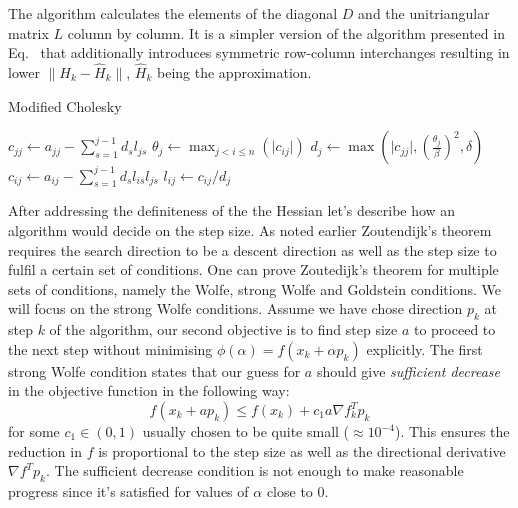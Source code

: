 \documentclass[11pt]{report}
\begin{document}
    The algorithm calculates the elements of the diagonal $D$ and the unitriangular matrix $L$ column by column.
    It is a simpler version of the algorithm presented in Eq.~\cite{gill2019practical} that additionally introduces symmetric row-column interchanges resulting in lower $ \lVert H_k - \hat{H}_k \rVert$, $\hat{H}_k$ being the approximation.
    \begin{algorithm}
        \label{alg:mod_chol}
        \caption{Modified Cholesky}
        \begin{algorithmic}
                \State $c_{jj} \gets a_{jj} - \sum_{s=1}^{j-1} d_s l_{js}$
                \State $\theta_j \gets \max_{j<i\leq n}(\lvert c_{ij} \rvert)$
                \State $d_j \gets  \max
                \left(
                \lvert c_{jj} \rvert,
                \left( \frac{\theta_j}{\beta} \right)^2,
                \delta \right)$
                    \State $c_{ij} \gets a_{ij} - \sum_{s=1}^{j-1} d_s l_{is} l_{js}$
                    \State $l_{ij} \gets c_{ij} / d_j$
                \EndFor
            \EndFor
        \end{algorithmic}
    \end{algorithm}
    After addressing the definiteness of the the Hessian let's describe how an algorithm would decide on the step size.
    As noted earlier Zoutendijk's theorem requires the search direction to be a descent direction as well as the step size to fulfil a certain set of conditions.
    One can prove Zoutedijk's theorem for multiple sets of conditions, namely the Wolfe, strong Wolfe and Goldstein conditions.
    We will focus on the strong Wolfe conditions.
    Assume we have chose direction $p_k$ at step $k$ of the algorithm, our second objective is to find step size $a$ to proceed to the next step without minimising $\phi(\alpha) = f(x_k + \alpha p_k)$ explicitly.
    The first strong Wolfe condition states that our guess for $a$ should give \textit{sufficient decrease} in the objective function in the following way:
    \begin{equation}
        f(x_k + ap_k) \leq f(x_k) + c_1 a \nabla f_k ^T p_k
    \end{equation}
    for some $c_1 \in (0,1)$ usually chosen to be quite small ($\approx 10^{-4}$). This ensures the reduction in $f$ is proportional to the step size as well as the directional derivative $\nabla f ^T p_k$.
    The sufficient decrease condition is not enough to make reasonable progress since it's satisfied for values of $\alpha$ close to 0.
\end{document}
